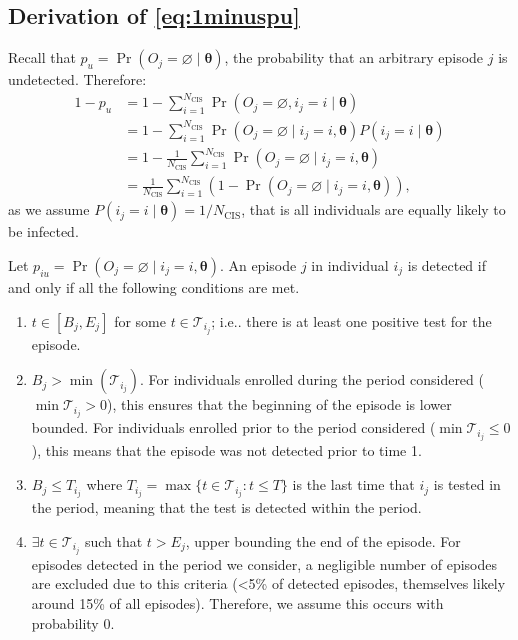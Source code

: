 \documentclass{article}
\makeatletter
\DeclareMathOperator{\prob}{\mathrm{Pr}}
\renewcommand{\vec}[1]{\bm{#1}}
\newcommand{\ssep}{:}
\newcommand{\Ncis}{N_\text{CIS}}
\newcommand{\sched}{\mathcal{T}}
\DeclareRobustCommand\onedot{\futurelet\@let@token\@onedot}
\def\@onedot{\ifx\@let@token.\else.\null\fi\xspace}
\def\ie{i.e\onedot} \def\Ie{{I.e}\onedot}
\makeatother
\begin{document}
\subsection{Derivation of \cref{eq:1minuspu}} \label{sec:derive-prob-undetected}

Recall that $p_u = \prob(O_j = \varnothing \mid \vec{\theta})$, the probability that an arbitrary episode $j$ is undetected.
Therefore:
\begin{align}
  1 - p_u
  &= 1 - \sum_{i=1}^{\Ncis} \prob(O_j = \varnothing, i_j = i \mid \vec{\theta}) \\
  &= 1 - \sum_{i=1}^{\Ncis} \prob(O_j = \varnothing \mid i_j = i, \vec{\theta}) P(i_j = i \mid \vec{\theta}) \\
  &= 1 - \frac{1}{\Ncis}\sum_{i=1}^{\Ncis} \prob(O_j = \varnothing \mid i_j = i, \vec{\theta}) \\
  &= \frac{1}{\Ncis} \sum_{i=1}^{\Ncis} (1 - \prob(O_j = \varnothing \mid i_j = i, \vec{\theta})), \label{perf-test:eq:pu}
\end{align}
as we assume $P(i_j = i \mid \vec{\theta}) = 1/\Ncis$, that is all individuals are equally likely to be infected.

Let $p_{iu} = \prob(O_j = \varnothing \mid i_j = i, \vec{\theta})$.
An episode $j$ in individual $i_j$ is detected if and only if all the following conditions are met.
\begin{enumerate}
    \item 
    $t\in[B_j, E_j]$ for some $t \in \sched_{i_j}$;
    \ie there is at least one positive test for the episode.
    \item $B_j > \min ( \sched_{i_j} )$.
      For individuals enrolled during the period considered ($\min \sched_{i_j} > 0$), this ensures that the beginning of the episode is lower bounded.
      For individuals enrolled prior to the period considered ($\min \sched_{i_j} \leq 0$), this means that the episode was not detected prior to time 1.
    \item $B_j \leq T_{i_j}$ where $T_{i_j} = \max \{ t \in \sched_{i_j} \ssep t \leq T \}$ is the last time that $i_j$ is tested in the period, meaning that the test is detected within the period.
    \item $\exists t \in \sched_{i_j}$ such that $t > E_j$, upper bounding the end of the episode.
      For episodes detected in the period we consider, a negligible number of episodes are excluded due to this criteria (<5\% of detected episodes, themselves likely around 15\% of all episodes).
      Therefore, we assume this occurs with probability 0.
\end{enumerate}
\end{document}
